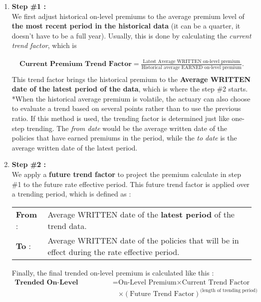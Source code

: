 \documentclass[11pt, english]{memoir}
\numberwithin{definition}{section}
\begin{document}
		\begin{enumerate}
			\item \textbf{Step \#1 :} \\[10pt]
			We first adjust historical on-level premiums to the average premium level of \textbf{the most recent period in the historical data} (it can be a quarter, it doesn't have to be a full year). Usually, this is done by calculating the \emph{current trend factor}, which is 
			
			\begin{align*}
			\textbf{Current Premium Trend Factor} = \frac{\text{Latest Average WRITTEN on-level premium}}{\text{Historical average EARNED on-level premium}}.\\
			\end{align*}
			This trend factor brings the historical premium to the \textbf{Average WRITTEN date of the latest period of the data}, which is where the step \#2 starts. \\
			
			\footnotesize**When the historical average premium is volatile, the actuary can also choose to evaluate a trend based on several points rather than to use the previous ratio. If this method is used, the trending factor is determined just like one-step trending. The \emph{from date} would be the average written date of the policies that have earned premiums in the period, while the \emph{to date} is the average written date of the latest period.\normalsize\\
			
			
			\item \textbf{Step \#2 :}\\[10pt]
			We apply a \textbf{future trend factor} to project the premium calculate in step \#1 to the future rate effective period. This future trend factor is applied over a trending period, which is defined as : \\
			
			\begin{tabular}{ll}
				\textbf{From} : & 	\begin{minipage}{0.8\linewidth}
					Average WRITTEN date of the \textbf{latest period} of the trend data.
				\end{minipage}\\[10pt]
				\textbf{To} : & \begin{minipage}{0.8\linewidth}
					Average WRITTEN date of the policies that will be in effect during the rate effective period.
				\end{minipage}\\ 
			\end{tabular}
			
			Finally, the final trended on-level premium is calculated like this :
			\begin{align*}
			\textbf{Trended On-Level Premium} = \  &\text{On-Level Premium} \times\text{Current Trend Factor}\\
			&\times(\text{Future Trend Factor})^{\text{(length of trending period)}}
			\end{align*}
		\end{enumerate} 
\end{document}
